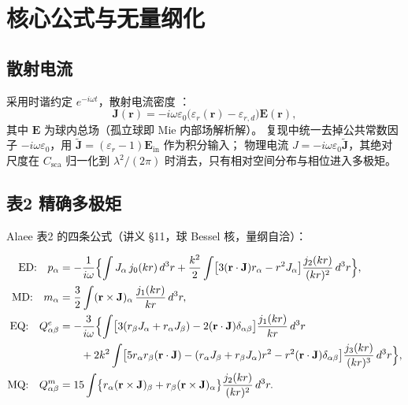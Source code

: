 \section{核心公式与无量纲化}

\subsection{散射电流}

采用时谐约定 $e^{-i\omega t}$，散射电流密度 \cite{Grahn2012}：
\begin{equation}
  \mathbf{J}(\mathbf{r}) = -i\omega\varepsilon_0\bigl(\varepsilon_r(\mathbf{r})-\varepsilon_{r,d}\bigr)\mathbf{E}(\mathbf{r}),
  \label{eq:J}
\end{equation}
其中 $\mathbf{E}$ 为球内总场（孤立球即 Mie 内部场解析解）。
复现中统一去掉公共常数因子 $-i\omega\varepsilon_0$，用
$\widetilde{\mathbf{J}}=(\varepsilon_r-1)\mathbf{E}_{\mathrm{in}}$ 作为积分输入；
物理电流 $J=-i\omega\varepsilon_0\widetilde{\mathbf{J}}$，其绝对尺度在 $C_{\mathrm{sca}}$
归一化到 $\lambda^2/(2\pi)$ 时消去，只有相对空间分布与相位进入多极矩。

\subsection{表2 精确多极矩}

Alaee 表2 的四条公式（讲义 §11，球 Bessel 核，量纲自洽）：

\begin{align}
  \text{ED:}\quad p_\alpha &= -\frac{1}{i\omega}\Bigl\{\int J_\alpha\,j_0(kr)\,d^3r
    + \frac{k^2}{2}\int\bigl[3(\mathbf{r}\cdot\mathbf{J})r_\alpha - r^2J_\alpha\bigr]
    \frac{j_2(kr)}{(kr)^2}\,d^3r\Bigr\}, \label{eq:ed}\\
  \text{MD:}\quad m_\alpha &= \frac32\int(\mathbf{r}\times\mathbf{J})_\alpha\,
    \frac{j_1(kr)}{kr}\,d^3r, \label{eq:md}\\
  \text{EQ:}\quad Q^e_{\alpha\beta} &= -\frac{3}{i\omega}\Bigl\{
    \int\bigl[3(r_\beta J_\alpha + r_\alpha J_\beta) - 2(\mathbf{r}\cdot\mathbf{J})\delta_{\alpha\beta}\bigr]
    \frac{j_1(kr)}{kr}\,d^3r \notag\\
    &\qquad + 2k^2\int\bigl[5r_\alpha r_\beta(\mathbf{r}\cdot\mathbf{J})
    - (r_\alpha J_\beta + r_\beta J_\alpha)r^2 - r^2(\mathbf{r}\cdot\mathbf{J})\delta_{\alpha\beta}\bigr]
    \frac{j_3(kr)}{(kr)^3}\,d^3r\Bigr\}, \label{eq:eq}\\
  \text{MQ:}\quad Q^m_{\alpha\beta} &= 15\int\bigl\{
    r_\alpha(\mathbf{r}\times\mathbf{J})_\beta + r_\beta(\mathbf{r}\times\mathbf{J})_\alpha\bigr\}
    \frac{j_2(kr)}{(kr)^2}\,d^3r. \label{eq:mq}
\end{align}

